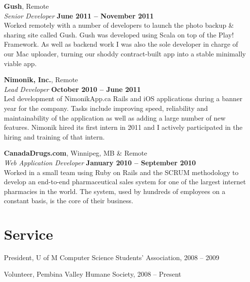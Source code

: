 \documentclass[margin,line,letterpaper]{resume}
\begin{document}
\begin{resume}
  {\bf Gush}, Remote \vspace{2mm}\\\vspace{1mm}%
  {\sl Senior Developer} \hfill {\bf June 2011 -- November 2011}\\
  Worked remotely with a number of developers to launch the photo backup \& sharing site called Gush. Gush was developed using Scala on top of the Play! Framework. As well as backend work I was also the sole developer in charge of our Mac uploader, turning our shoddy contract-built app into a stable minimally viable app.

  {\bf Nimonik, Inc.}, Remote \vspace{2mm}\\\vspace{1mm}%
  {\sl Lead Developer} \hfill {\bf October 2010 -- June 2011}\\
  Led development of NimonikApp.ca Rails and iOS applications during a banner year for the company. Tasks include improving speed, reliability and maintainability of the application as well as adding a large number of new features. Nimonik hired its first intern in 2011 and I actively participated in the hiring and training of that intern.

  {\bf CanadaDrugs.com}, Winnipeg, MB \& Remote \vspace{2mm}\\\vspace{1mm}%
  {\sl Web Application Developer} \hfill {\bf January 2010 -- September 2010}\\
  Worked in a small team using Ruby on Rails and the SCRUM methodology to develop an end-to-end pharmaceutical sales system for one of the largest internet pharmacies in the world. The system, used by hundreds of employees on a constant basis, is the core of their business.

  \section{\mysidestyle Service}

  \begin{list2}
    \item President, U of M Computer Science Students' Association, 2008 -- 2009
    \item Volunteer, Pembina Valley Humane Society, 2008 -- Present
  \end{list2}


\end{resume}
\end{document}

